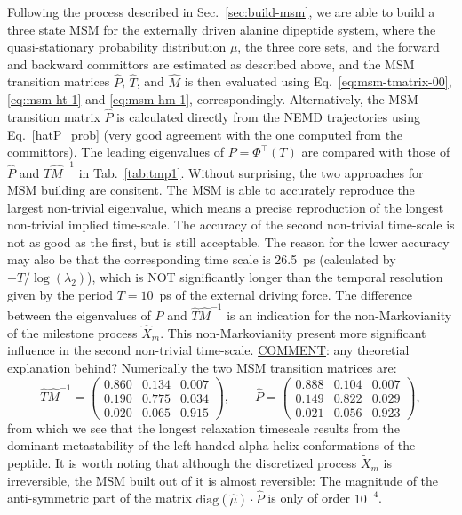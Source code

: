 \documentclass[aps, pre, preprint,unsortedaddress,a4paper,onecolumn]{revtex4}
\newcommand{\recheck}[1]{{\color{red} #1}}
\newcommand{\myphi}{\Phi}
\begin{document}
Following the process described in Sec.~\ref{sec:build-msm}, we are able to build a 
three state MSM for the externally driven alanine dipeptide system,
where the quasi-stationary probability distribution $\mu$, the three core sets, and the forward and backward committors are
estimated as described above, and the MSM transition matrices $\hat P$, $\hat{T}$, and $\hat{M}$ is then evaluated using Eq.~\eqref{eq:msm-tmatrix-00}, \eqref{eq:msm-ht-1} and \eqref{eq:msm-hm-1}, correspondingly.
Alternatively, the MSM  transition matrix $\hat P$ is calculated directly from the NEMD trajectories using Eq.~\eqref{hatP_prob} (very good agreement with the one computed from the committors).
The leading eigenvalues of $P=\myphi^{\top}(T)$ are compared with those of $\hat P$ and $\hat{T}\hat{M}^{-1}$ in
Tab.~\ref{tab:tmp1}.
Without surprising, the two approaches for MSM building are consitent.
The MSM is able to accurately reproduce
the largest non-trivial eigenvalue, which means a precise reproduction
of the longest non-trivial implied time-scale. The accuracy of the second non-trivial
time-scale is not as good as the first, but is still acceptable.
The reason
for the lower accuracy may also be that
the corresponding time scale is 26.5~ps (calculated by $-T/\log(\lambda_2)$),
which is NOT significantly longer than the temporal resolution given by the period $T=10$~ps of the external driving force.
\recheck{The difference between the eigenvalues of $\hat P$ and $\hat T\hat{M}^{-1}$
  is an indication for the non-Markovianity of the milestone process $\hat X_m$. This
  non-Markovianity present more significant influence in the second non-trivial time-scale.}
\recheck{\underline{COMMENT}: any theoretial explanation behind?}
Numerically the two MSM transition matrices are:
\[
\hat{T}\hat{M}^{-1}=\left(\begin{array}{ccc}
   0.860 &   0.134 &   0.007 \\
    0.190  &  0.775  &  0.034\\
    0.020   & 0.065 &   0.915
\end{array}
\right),\qquad \hat{P}=\left(\begin{array}{ccc}
   0.888 &   0.104 &   0.007 \\
    0.149  &  0.822  &  0.029\\
    0.021   & 0.056 &   0.923
\end{array}
\right),
\]
from which we see that the longest relaxation timescale results from  the dominant metastability of the left-handed alpha-helix conformations of the peptide. 
It is worth noting that although the discretized process $\tilde X_m$ is irreversible,
the MSM built out of it is almost reversible:
The magnitude of the anti-symmetric part of the
matrix $\textrm{diag}(\hat \mu)\cdot \hat P$ is only of order $10^{-4}$.
\end{document}
